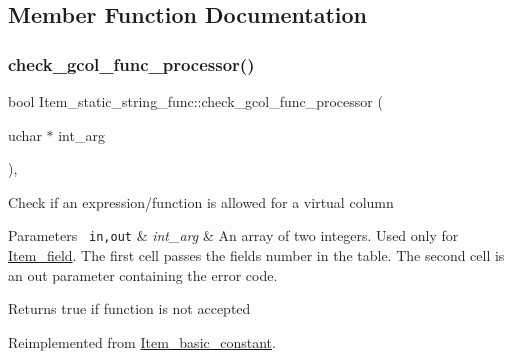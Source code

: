 \subsection{Member Function Documentation}
\mbox{\label{classItem__static__string__func_affbcad090aae0059272342f77d51ae90}} 
\subsubsection{\texorpdfstring{check\+\_\+gcol\+\_\+func\+\_\+processor()}{check\_gcol\_func\_processor()}}
{\footnotesize\ttfamily bool Item\+\_\+static\+\_\+string\+\_\+func\+::check\+\_\+gcol\+\_\+func\+\_\+processor (\begin{DoxyParamCaption}\item[{uchar $\ast$}]{int\+\_\+arg }\end{DoxyParamCaption})\hspace{0.3cm}{\ttfamily [inline]}, {\ttfamily [virtual]}}

Check if an expression/function is allowed for a virtual column


\begin{DoxyParams}[1]{Parameters}
\mbox{\texttt{ in,out}}  & {\em int\+\_\+arg} & An array of two integers. Used only for \mbox{\hyperlink{classItem__field}{Item\+\_\+field}}. The first cell passes the field\textquotesingle{}s number in the table. The second cell is an out parameter containing the error code.\\
\hline
\end{DoxyParams}
\begin{DoxyReturn}{Returns}
true if function is not accepted 
\end{DoxyReturn}


Reimplemented from \mbox{\hyperlink{classItem__basic__constant_a6240f3253090d2fc91f87a7a1cb773a7}{Item\+\_\+basic\+\_\+constant}}.

\mbox{\label{classItem__static__string__func_a592a40880113216f223f6c484622ac0d}} 
